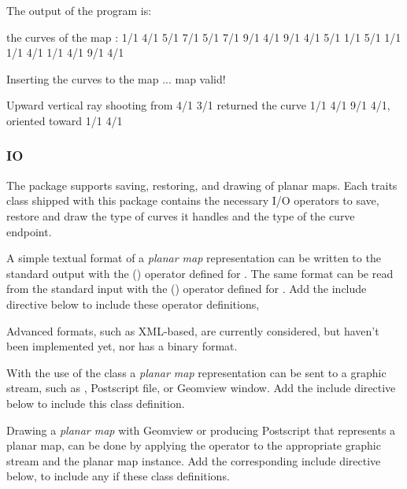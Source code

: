 
The output of the program is:

\begin{ccExampleCode}
the curves of the map :
1/1 4/1 5/1 7/1
5/1 7/1 9/1 4/1
9/1 4/1 5/1 1/1
5/1 1/1 1/1 4/1
1/1 4/1 9/1 4/1

Inserting the curves to the map ... map valid!

Upward vertical ray shooting from 4/1 3/1
returned the curve 1/1 4/1 9/1 4/1, oriented toward 1/1 4/1
\end{ccExampleCode}

\subsubsection{IO}
The  package supports saving, restoring, and drawing
of planar maps. Each traits class shipped with this package contains
the necessary I/O operators to save, restore and draw the type of
curves it handles and the type of the curve endpoint.

A simple textual format of a {\em planar map} representation can be
written to the standard output with the  (\ccc{ >> })
operator defined for . The same format can be read
from the standard input with the  (\ccc{ << }) operator
defined for . Add the include directive below to
include these operator definitions,


Advanced formats, such as XML-based, are currently considered, but
haven't been implemented yet, nor has a binary format.

With the use of the  class a {\em planar map}
representation can be sent to a graphic stream, such as
, Postscript file, or Geomview window.
Add the include directive below to include this class definition.


Drawing a {\em planar map} with Geomview or producing Postscript that
represents a planar map, can be done by applying the 
operator to the appropriate graphic stream and the planar map
instance. Add the corresponding include directive below, to include
any if these class definitions.

\\

